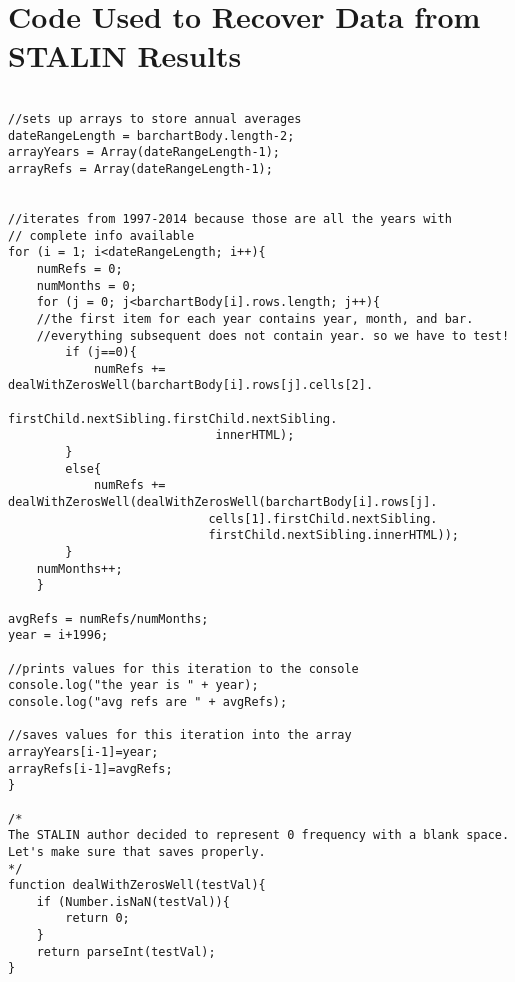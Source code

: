 \chapter{Code Used to Recover Data from STALIN Results}

\begin{verbatim}

//sets up arrays to store annual averages
dateRangeLength = barchartBody.length-2;
arrayYears = Array(dateRangeLength-1);
arrayRefs = Array(dateRangeLength-1);


//iterates from 1997-2014 because those are all the years with
// complete info available
for (i = 1; i<dateRangeLength; i++){
    numRefs = 0;
    numMonths = 0;
    for (j = 0; j<barchartBody[i].rows.length; j++){
    //the first item for each year contains year, month, and bar.
    //everything subsequent does not contain year. so we have to test!
        if (j==0){
            numRefs += dealWithZerosWell(barchartBody[i].rows[j].cells[2].
                             firstChild.nextSibling.firstChild.nextSibling.
                             innerHTML);
        }
        else{
            numRefs += dealWithZerosWell(dealWithZerosWell(barchartBody[i].rows[j].
                            cells[1].firstChild.nextSibling.
                            firstChild.nextSibling.innerHTML));
        }
    numMonths++;
    }
	
avgRefs = numRefs/numMonths;
year = i+1996;

//prints values for this iteration to the console
console.log("the year is " + year);
console.log("avg refs are " + avgRefs);

//saves values for this iteration into the array
arrayYears[i-1]=year;
arrayRefs[i-1]=avgRefs;
}

/*
The STALIN author decided to represent 0 frequency with a blank space. Let's make sure that saves properly.
*/
function dealWithZerosWell(testVal){
    if (Number.isNaN(testVal)){
        return 0;
    }
    return parseInt(testVal);
}
\end{verbatim}

\clearpage
\newpage
